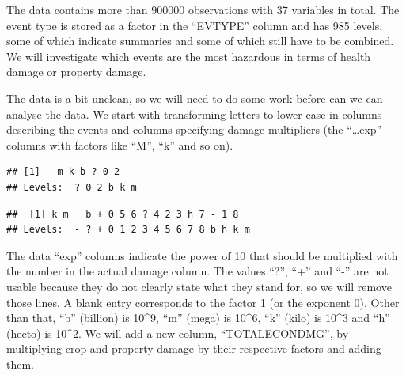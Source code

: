 \documentclass[]{article}
\newenvironment{Shaded}{\begin{snugshade}}{\end{snugshade}}
\newcommand{\KeywordTok}[1]{\textcolor[rgb]{0.13,0.29,0.53}{\textbf{{#1}}}}
\newcommand{\StringTok}[1]{\textcolor[rgb]{0.31,0.60,0.02}{{#1}}}
\newcommand{\NormalTok}[1]{{#1}}
\begin{document}
The data contains more than 900000 observations with 37 variables in
total. The event type is stored as a factor in the ``EVTYPE'' column and
has 985 levels, some of which indicate summaries and some of which still
have to be combined. We will investigate which events are the most
hazardous in terms of health damage or property damage.

The data is a bit unclean, so we will need to do some work before can we
can analyse the data. We start with transforming letters to lower case
in columns describing the events and columns specifying damage
multipliers (the ``\ldots{}exp'' columns with factors like ``M'', ``k''
and so on).

\begin{Shaded}
\end{Shaded}

\begin{verbatim}
## [1]   m k b ? 0 2
## Levels:  ? 0 2 b k m
\end{verbatim}

\begin{Shaded}
\end{Shaded}

\begin{verbatim}
##  [1] k m   b + 0 5 6 ? 4 2 3 h 7 - 1 8
## Levels:  - ? + 0 1 2 3 4 5 6 7 8 b h k m
\end{verbatim}

The data ``exp'' columns indicate the power of 10 that should be
multiplied with the number in the actual damage column. The values
``?'', ``+'' and ``-'' are not usable because they do not clearly state
what they stand for, so we will remove those lines. A blank entry
corresponds to the factor 1 (or the exponent 0). Other than that, ``b''
(billion) is 10\^{}9, ``m'' (mega) is 10\^{}6, ``k'' (kilo) is 10\^{}3
and ``h'' (hecto) is 10\^{}2. We will add a new column,
``TOTALECONDMG'', by multiplying crop and property damage by their
respective factors and adding them.
\end{document}
